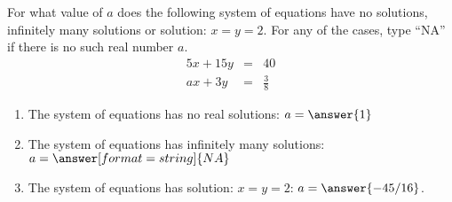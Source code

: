 \documentclass{ximera}
\author{Parisa Fatheddin}
\begin{document}
\begin{exercise}  For what value of $a$ does the following system of equations have no solutions, infinitely many solutions or solution: $x=y=2$. For any of the cases, type ``NA'' if there is no such real number $a$.
\begin{eqnarray*}
5x+15y &=& 40\\ ax +3y &=& \frac{3}{8}
\end{eqnarray*}
\begin{prompt}
  \begin{enumerate}
    \item The system of equations has no real solutions: $a= \answer{1}$
    \item The system of equations has infinitely many solutions: $a= \answer[format=string]{NA}$
    \item The system of equations has solution: $x=y=2$: $a=\answer{-45/16}$.
  \end{enumerate}
\end{prompt}
\end{exercise}
\end{document}
